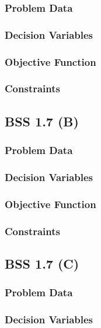 \documentclass[12pt]{article}
\begin{document}
\subsubsection{Problem Data}

\subsubsection{Decision Variables}

\subsubsection{Objective Function}

\subsubsection{Constraints}

\subsection{BSS 1.7 (B)}
\subsubsection{Problem Data}

\subsubsection{Decision Variables}

\subsubsection{Objective Function}

\subsubsection{Constraints}

\subsection{BSS 1.7 (C)}
\subsubsection{Problem Data}

\subsubsection{Decision Variables}
\end{document}
